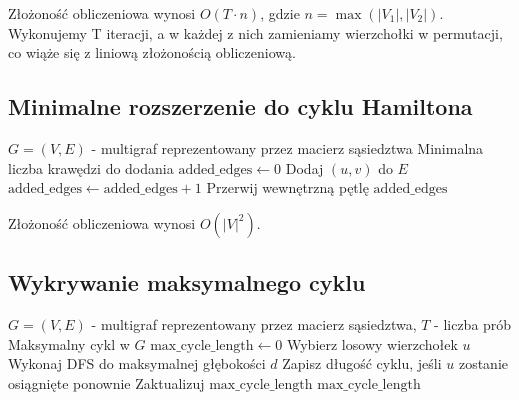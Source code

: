 Złożoność obliczeniowa wynosi \( O(T \cdot n) \), gdzie \( n = \max(|V_1|, |V_2|) \). Wykonujemy T iteracji, a w każdej z nich zamieniamy wierzchołki w permutacji, co wiąże się z liniową złożonością obliczeniową.

\subsection{Minimalne rozszerzenie do cyklu Hamiltona}

\begin{algorithm}[H]
\caption{Aproksymacyjne minimalne rozszerzenie do cyklu Hamiltona}
\label{alg:approx_minimal_extension}
\begin{algorithmic}[1]
\Require \( G = (V, E) \) - multigraf reprezentowany przez macierz sąsiedztwa
\Ensure Minimalna liczba krawędzi do dodania
\State \( \text{added\_edges} \gets 0 \)
            \State Dodaj \( (u, v) \) do \( E \)
            \State \( \text{added\_edges} \gets \text{added\_edges} + 1 \)
            \State Przerwij wewnętrzną pętlę
        \EndIf
    \EndFor
\EndFor
\State \Return \( \text{added\_edges} \)
\end{algorithmic}
\end{algorithm}

Złożoność obliczeniowa wynosi \( O(|V|^2) \).

\subsection{Wykrywanie maksymalnego cyklu}

\begin{algorithm}[H]
\caption{Aproksymacyjne wykrywanie maksymalnego cyklu}
\label{alg:approx_maximal_cycle}
\begin{algorithmic}[1]
\Require \( G = (V, E) \) - multigraf reprezentowany przez macierz sąsiedztwa, \( T \) - liczba prób
\Ensure Maksymalny cykl w \( G \)
\State \( \text{max\_cycle\_length} \gets 0 \)
    \State Wybierz losowy wierzchołek \( u \)
    \State Wykonaj DFS do maksymalnej głębokości \( d \)
    \State Zapisz długość cyklu, jeśli \( u \) zostanie osiągnięte ponownie
        \State Zaktualizuj \( \text{max\_cycle\_length} \)
    \EndIf
\EndFor
\State \Return \( \text{max\_cycle\_length} \)
\end{algorithmic}
\end{algorithm}

